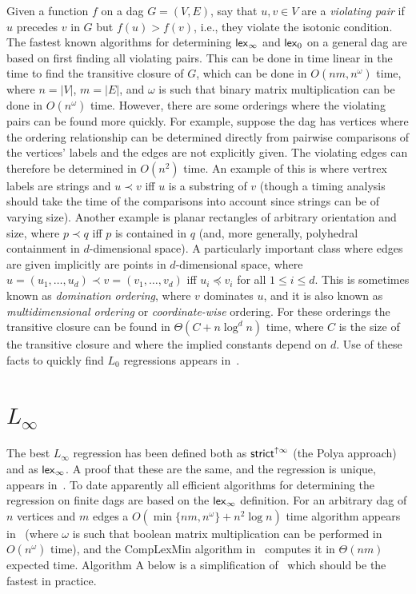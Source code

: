 \documentclass[11pt]{article}
\newcommand{\Strictup}[2]{\ensuremath{\mathsf{strict}^{\uparrow {#1}}\ifthenelse{\equal{#2}{}}{}{(#2)}}}
\newcommand{\lex}[2]{\ensuremath{\mathsf{lex}_{#1} \ifthenelse{\equal{#2}{}}{}{(#2)}}}
\begin{document}
Given a function $f$ on a dag $G=(V,E)$, say that $u,v \in V$ are a \textit{violating pair} if $u$ precedes $v$ in $G$ but $f(u) > f(v)$, i.e., they violate the isotonic condition.
The fastest known algorithms for determining \lex{\infty}{} and \lex{0}{} on a general dag are based on first finding all violating pairs.
This can be done in time linear in the time to find the transitive closure of $G$, which can be done in 
$O(nm, n^\omega)$ time, where $n = |V|$, $m=|E|$, and $\omega$ is such that binary matrix multiplication can be done in $O(n^\omega)$ time.
However, there are some orderings where the violating pairs can be found more quickly.
For example, suppose the dag has vertices where the ordering relationship can be determined directly from pairwise comparisons of the vertices' labels and the edges are not explicitly given.
The violating edges can therefore be determined in $O(n^2)$ time.
An example of this is where vertrex labels are strings and $u \prec v$ iff $u$ is a substring of $v$ (though a timing analysis should take the time of the comparisons into account since strings can be of varying size).
Another example is planar rectangles of arbitrary orientation and size, where $p \prec q$ iff $p$ is contained in $q$ (and, more generally, polyhedral containment in $d$-dimensional space).
A particularly important class where edges are given implicitly are points in $d$-dimensional space, where $u = (u_1,\ldots,u_d) \prec v=(v_1,\ldots,v_d)$ iff $u_i \preceq v_i$ for all $1 \leq i \leq d$.
This is sometimes known as \textit{domination ordering}, where $v$ dominates $u$, and it is also known as \textit{multidimensional ordering} or \textit{coordinate-wise} ordering.
For these orderings the transitive closure can be found in $\Theta(C + n \log^d n)$ time, where $C$ is the size of the transitive closure and where the implied constants depend on $d$.
Use of these facts to quickly find $L_0$ regressions appears in~\cite{QL0Secondary}.



\section{$L_\infty$ } \label{sec:Linfty}


The best $L_\infty$ regression has been defined both as \Strictup{\infty}{} (the Polya approach) and as \lex{\infty}{}.
A proof that these are the same, and the regression is unique, appears in~\cite{QStrictLinfty}.
To date apparently all efficient algorithms for determining the regression on finite dags are based on the \lex{\infty}{} definition.
For an arbitrary dag of $n$ vertices and $m$ edges a $O(\min\{nm,n^\omega\} + n^2 \log n)$ time algorithm appears in~\cite{QStrictLinfty} (where $\omega$ is such that boolean matrix multiplication can be performed in $O(n^\omega)$ time), and
the CompLexMin algorithm in~\cite{Yale_LipschitzLearn} computes it in $\Theta(nm)$ expected time.
Algorithm A below is a simplification of~\cite{QStrictLinfty} which should be the fastest in practice.
\end{document}

